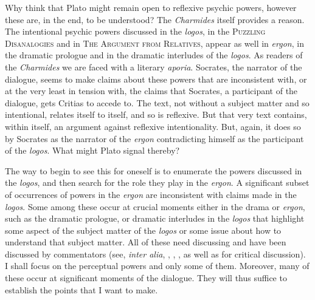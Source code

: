 Why think that Plato might remain open to reflexive psychic powers, however these are, in the end, to be understood? The \emph{Charmides} itself provides a reason. The intentional psychic powers discussed in the \emph{logos}, in the \textsc{Puzzling Disanalogies} and in \textsc{The Argument from Relatives}, appear as well in \emph{ergon}, in the dramatic prologue and in the dramatic interludes of the \emph{logos}. As readers of the \emph{Charmides} we are faced with a literary \emph{aporia}. Socrates, the narrator of the dialogue, seems to make claims about these powers that are inconsistent with, or at the very least in tension with, the claims that Socrates, a participant of the dialogue, gets Critias to accede to. The text, not without a subject matter and so intentional, relates itself to itself, and so is reflexive. But that very text contains, within itself, an argument against reflexive intentionality. But, again, it does so by Socrates as the narrator of the \emph{ergon} contradicting himself  as the participant of the \emph{logos}. What might Plato signal thereby?

The way to begin to see this for oneself is to enumerate the powers discussed in the \emph{logos}, and then search for the role they play in the \emph{ergon}. A significant subset of occurrences of powers in the \emph{ergon} are inconsistent with claims made in the \emph{logos}. Some among these occur at crucial moments either in the drama or \emph{ergon}, such as the dramatic prologue, or dramatic interludes in the \emph{logos} that highlight some aspect of the subject matter of the \emph{logos} or some issue about how to understand that subject matter. All of these need discussing and have been discussed by commentators (see, \emph{inter alia}, \citealt{Hyland:1981aa}, \citealt{Schmid:1998aa}, \citealt{McCabe:2007ss}, \citealt{Woolf:2023aa} as well as \citealt{Tsouna:2022aa} for critical discussion). I shall focus on the perceptual powers and only some of them. Moreover, many of these occur at significant moments of the dialogue. They will thus suffice to establish the points that I want to make.

